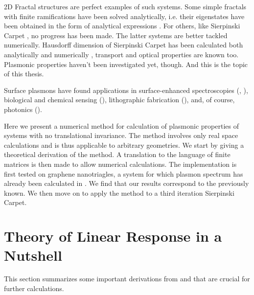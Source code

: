 \documentclass[a4paper,12pt]{article}
\begin{document}
    2D Fractal structures  are perfect examples of such systems. Some simple fractals with finite ramifications  have been solved analytically, i.e. their eigenstates have been obtained in the form of analytical expressions \cite{kadanoff1983}. For others, like Sierpinski Carpet , no progress has been made. The latter systems are better tackled numerically. Hausdorff dimension  of Sierpinski Carpet has been calculated both analytically \cite{mcmullen1984hausdorff} and numerically \cite{transport2016}, transport \cite{transport2016} and optical \cite{optics2017} properties are known too. Plasmonic  properties haven't been investigated yet, though. And this is the topic of this thesis.

    Surface plasmons  have found applications in surface-enhanced spectroscopies (\cite{raman2005}, \cite{second-harmonic1994}),  biological and chemical sensing (\cite{towards2005}), lithographic fabrication (\cite{nanolithography2004}), and, of course, photonics (\cite{brongersma2007surface}).

    Here we present a numerical method for calculation of plasmonic properties of systems with no translational invariance. The method involves only real space calculations and is thus applicable to arbitrary geometries. We start by giving a theoretical derivation of the method. A translation to the language of finite matrices is then made to allow numerical calculations. The implementation is first tested on graphene nanotriagles, a system for which plasmon spectrum has already been calculated in \cite{plasmonic2015}. We find that our results correspond to the previously known. We then move on to apply the method to a third iteration Sierpinski Carpet. 


\newpage
\section{Theory of Linear Response in a Nutshell} \label{sec:linear_response}
    This section summarizes some important derivations from \cite{vonsovskiui1989quantum} and \cite{giuliani2005quantum} that are crucial for further calculations.
\end{document}
